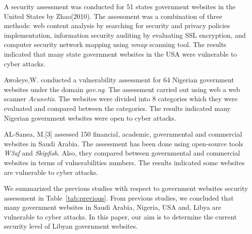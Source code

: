 \documentclass[conference,letterpaper]{IEEEtran}
\begin{document}
A security assessment was conducted for 51 states government websites in the
United States by Zhao(2010)\cite{zhao2010opportunities}. The assessment was a
combination of three methods: web content analysis by searching for security and
privacy policies implementation, information security auditing by evaluating SSL
encryption, and computer security network mapping using \emph{nmap} scanning
tool. The results indicated that many state government websites in the USA were
vulnerable to cyber attacks.

Awoleye,W.\cite{awoleye2012technological}\cite{awoleye2014web} conducted a
vulnerability assessment for 64 Nigerian government websites under the domain
\emph{gov.ng}. The assessment carried out using web a web scanner
\emph{Acunetix}. The websites were divided into 8 categories which they were
evaluated and compared between the categories. The results indicated many
Nigerian government websites were open to cyber attacks.

AL-Sanea, M.[3] assessed 150 financial, academic, governmental and commercial
websites in Saudi Arabia. The assessment has been done using open-source tools
\emph{W3af} and \emph{Skipfish}. Also, they compared between governmental and
commercial websites in terms of vulnerabilities numbers. The results indicated
some websites are vulnerable to cyber attacks.

We summarized the previous studies with respect to government websites security
assessment in Table~\ref{tab:previous}. From previous studies, we concluded that
many government websites in Saudi Arabia, Nigeria, USA and, Libya are vulnerable
to cyber attacks. In this paper, our aim is to determine the current security
level of Libyan government websites.
\end{document}
